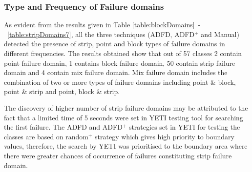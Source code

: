 







\subsubsection{Type and Frequency of Failure domains}

As evident from the results given in Table \ref{table:blockDomains}~-~\ref{table:stripDomains7}, all the three techniques (ADFD, ADFD$^+$ and Manual) detected the presence of strip, point and block types of failure domains in different frequencies. The results obtained show that out of 57 classes 2 contain point failure domain, 1 contains block failure domain, 50 contain strip failure domain and 4 contain mix failure domain. Mix failure domain includes the combination of two or more types of failure domains including point \& block, point \& strip and point, block \& strip.


The discovery of higher number of strip failure domains may be attributed to the fact that a limited time of 5 seconds were set in YETI testing tool for searching the first failure. The ADFD and ADFD$^+$ strategies set in YETI for testing the classes are based on random$^+$ strategy which gives high priority to boundary values, therefore, the search by YETI was prioritised to the boundary area where there were greater chances of occurrence of failures constituting strip failure domain.

